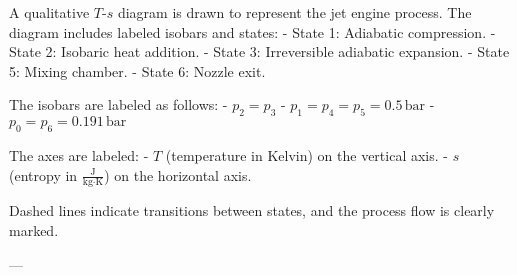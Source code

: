 A qualitative \( T \)-\( s \) diagram is drawn to represent the jet engine process. The diagram includes labeled isobars and states:  
- State 1: Adiabatic compression.  
- State 2: Isobaric heat addition.  
- State 3: Irreversible adiabatic expansion.  
- State 5: Mixing chamber.  
- State 6: Nozzle exit.  

The isobars are labeled as follows:  
- \( p_2 = p_3 \)  
- \( p_1 = p_4 = p_5 = 0.5 \, \text{bar} \)  
- \( p_0 = p_6 = 0.191 \, \text{bar} \)  

The axes are labeled:  
- \( T \) (temperature in Kelvin) on the vertical axis.  
- \( s \) (entropy in \( \frac{\text{J}}{\text{kg·K}} \)) on the horizontal axis.  

Dashed lines indicate transitions between states, and the process flow is clearly marked.  

---